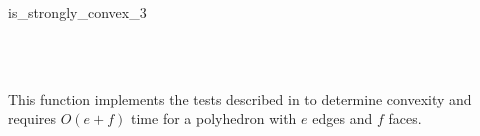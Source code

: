 \begin{ccRefFunction}{is_strongly_convex_3}
\ccSeeAlso

 \\
 \\


\ccImplementation

This function implements the tests described in \cite{mnssssu-cgpvg-96} to 
determine convexity and requires $O(e + f)$ time for a polyhedron with
$e$ edges and $f$ faces.

\end{ccRefFunction}
